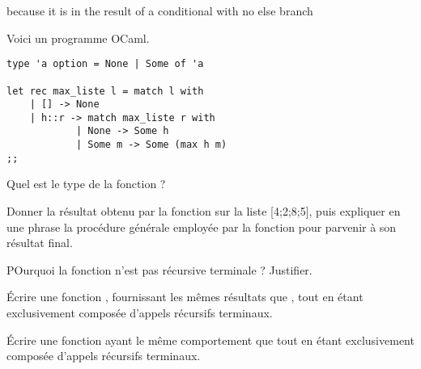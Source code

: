 \documentclass{report}
\begin{document}
\begin{exo}
\begin{q}{7}
{{        because it is in the result of a conditional with no else branch}}
    \end{q}
    \begin{q}{8}
    \end{q}
    \begin{q}{9}
    \end{q}
    \begin{q}{10}
    \end{q}
\end{exo}
\clearpage

\begin{exo}
    Voici un programme OCaml.
    \begin{lstlisting}
type 'a option = None | Some of 'a

let rec max_liste l = match l with
    | [] -> None
    | h::r -> match max_liste r with
            | None -> Some h
            | Some m -> Some (max h m)
;;\end{lstlisting}

    \begin{q}{1}
        Quel est le type de la fonction  ?
    \end{q}
    \begin{q}{2}
        Donner la résultat obtenu par la fonction  sur la liste [4;2;8;5],
        puis expliquer en une phrase la procédure générale employée par la fonction
         pour parvenir à son résultat final.
    \end{q}
    \begin{q}{3}
        POurquoi la fonction  n'est pas récursive terminale ? Justifier.
    \end{q}
    \begin{q}{4}
        Écrire une fonction , fournissant les mêmes résultats que
        , tout en étant exclusivement composée d'appels récursifs terminaux.
    \end{q}
    \begin{q}{5}
        Écrire une fonction  ayant le
        même comportement que  tout en étant exclusivement composée
        d'appels récursifs terminaux.
    \end{q}
\end{exo}
\end{document}
